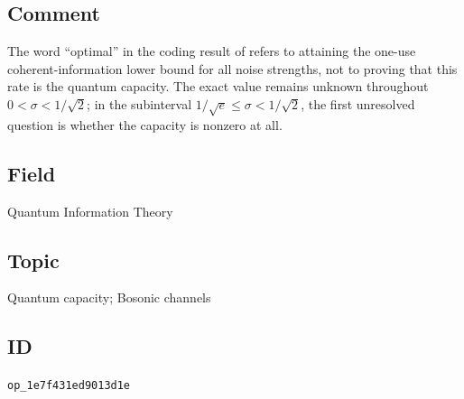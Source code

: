 \subsection*{Comment}

The word ``optimal'' in the coding result of
 refers to attaining the
one-use coherent-information lower bound for all noise strengths, not to
proving that this rate is the quantum capacity.  The exact value remains
unknown throughout $0<\sigma<1/\sqrt2$; in the subinterval
$1/\sqrt e\leq\sigma<1/\sqrt2$, the first unresolved question is whether the
capacity is nonzero at all.

\subsection*{Field}

Quantum Information Theory

\subsection*{Topic}

Quantum capacity; Bosonic channels

\subsection*{ID}

\texttt{op\_1e7f431ed9013d1e}
